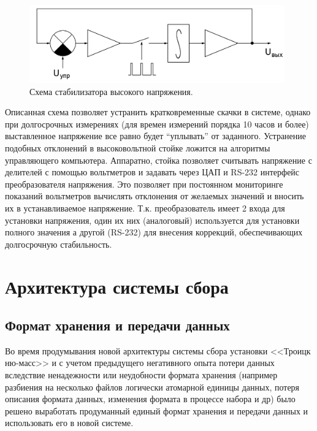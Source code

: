 \documentclass[a4paper,14pt]{extreport}
\begin{document}
\begin{figure}
  \centering
  \includegraphics[width = 0.98\textwidth]{img/nu_mass_setup/hv_stabilizer_scheme.png}
    \caption{Схема стабилизатора высокого напряжения.}
    \label{fig:numass-hv-stabilizer-scheme}
\end{figure}

Описанная схема позволяет устранить кратковременные скачки в системе, однако при долгосрочных измерениях (для времен измерений порядка 10 часов и более) выставленное напряжение все равно будет “уплывать” от заданного. Устранение подобных отклонений в высоковольтной стойке ложится на алгоритмы управляющего компьютера. Аппаратно, стойка позволяет считывать напряжение с делителей с помощью вольтметров и задавать через ЦАП и  RS-232 интерфейс преобразователя напряжения. Это позволяет при постоянном мониторинге показаний вольтметров вычислять отклонения от желаемых значений и вносить их в устанавливаемое напряжение. Т.к. преобразователь имеет 2 входа для установки напряжения, один их них (аналоговый) используется для установки полного значения а другой (RS-232) для внесения коррекций, обеспечивающих долгосрочную стабильность.

\chapter{Архитектура системы сбора}
\section{Формат хранения и передачи данных}
Во время продумывания новой архитектуры системы сбора установки <<Троицк ню-масс>> и с учетом предыдущего негативного опыта потери данных вследствие ненадежности или неудобности формата хранения (например разбиения на несколько файлов логически атомарной единицы данных, потеря описания формата данных, изменения формата в процессе набора и др) было решено выработать продуманный единый формат хранения и передачи данных и использовать его в новой системе.
\end{document}

